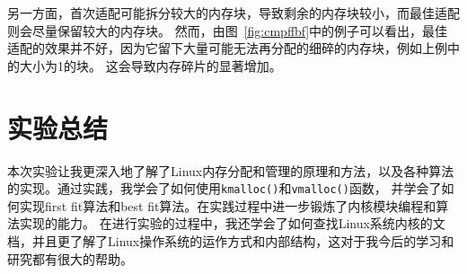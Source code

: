 \documentclass[a4paper,twoside]{article}
\begin{document}
\begin{spacing}{1.2}
另一方面，首次适配可能拆分较大的内存块，导致剩余的内存块较小，而最佳适配则会尽量保留较大的内存块。
然而，由图~\ref{fig:cmpffbf}中的例子可以看出，最佳适配的效果并不好，因为它留下大量可能无法再分配的细碎的内存块，例如上例中的大小为1的块。
这会导致内存碎片的显著增加。


\section{实验总结}

本次实验让我更深入地了解了Linux内存分配和管理的原理和方法，以及各种算法的实现。通过实践，我学会了如何使用\texttt{kmalloc()}和\texttt{vmalloc()}函数，
并学会了如何实现first fit算法和best fit算法。在实践过程中进一步锻炼了内核模块编程和算法实现的能力。
在进行实验的过程中，我还学会了如何查找Linux系统内核的文档，并且更了解了Linux操作系统的运作方式和内部结构，这对于我今后的学习和研究都有很大的帮助。


\end{spacing}
\end{document}
